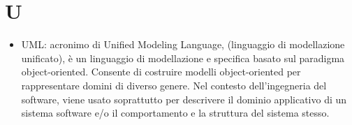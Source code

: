 %
%
%
%

\section{U}

\begin{itemize}

	\item UML: acronimo di Unified Modeling Language, (linguaggio di modellazione unificato), è un linguaggio di modellazione e specifica basato sul paradigma object-oriented. Consente di costruire modelli object-oriented per rappresentare domini di diverso genere. Nel contesto dell’ingegneria del software, viene usato soprattutto per descrivere il dominio applicativo di un sistema software e/o il comportamento e la struttura del sistema stesso.


\end{itemize}